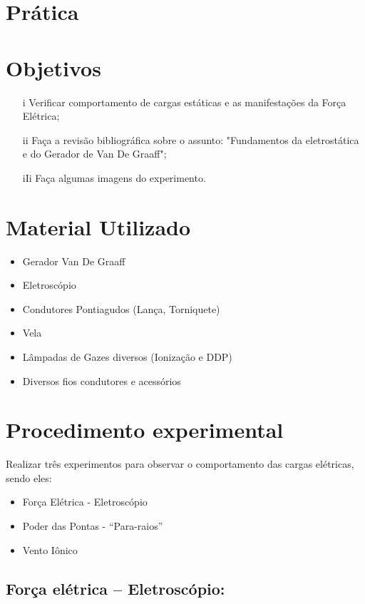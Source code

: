 \section*{Prática}
\section{Objetivos}
\begin{itemize}
    \item[i] Verificar comportamento de cargas estáticas e as manifestações da Força Elétrica;
    \item[ii] Faça a revisão bibliográfica sobre o assunto: "Fundamentos da eletrostática e do Gerador de Van De Graaff";
    \item[iIi] Faça algumas imagens do experimento.
\end{itemize}

\section{Material Utilizado}
\begin{itemize}
    \item Gerador Van De Graaff
    \item Eletroscópio
    \item Condutores Pontiagudos (Lança, Torniquete)
    \item Vela
    \item Lâmpadas de Gazes diversos (Ionização e DDP)
    \item Diversos fios condutores e acessórios
\end{itemize}

\section{Procedimento experimental}
Realizar três experimentos para observar o comportamento das cargas elétricas, 
sendo eles:

\begin{itemize}
    \item  Força Elétrica - Eletroscópio
    \item  Poder das Pontas - “Para-raios”
    \item  Vento Iônico
\end{itemize}

\subsection{Força elétrica – Eletroscópio:}

